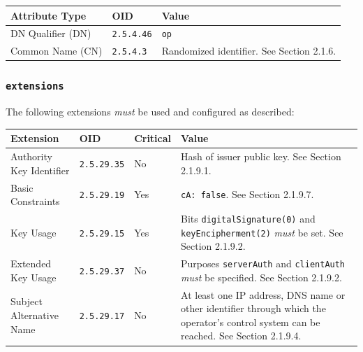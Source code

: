 \vspace*{0.5cm}
\noindent\begin{tabularx}{\textwidth}{| p{4cm} | p{2cm} | X |} \hline
\rowcolor{gray!33} Attribute Type & OID               & Value \\ \hline

DN Qualifier (DN)                 & \texttt{2.5.4.46} & \texttt{op} \\ \hline
Common Name (CN)                  & \texttt{2.5.4.3}  &  Randomized identifier. See Section 2.1.6. \\ \hline

\end{tabularx}
\vspace*{0.5cm}

\subsubsection{\texttt{extensions}}

The following extensions \textit{must} be used and configured as described:

\vspace*{0.5cm}
\noindent\begin{tabularx}{\textwidth}{| p{4cm} | p{2cm} | p{1.2cm} | X |} \hline
\rowcolor{gray!33} Extension & OID                & Critical & Value \\ \hline

Authority Key Identifier     & \texttt{2.5.29.35} & No       & Hash of issuer public key. See Section 2.1.9.1. \\ \hline
Basic Constraints            & \texttt{2.5.29.19} & Yes      & \texttt{cA: false}. See Section 2.1.9.7. \\ \hline
Key Usage                    & \texttt{2.5.29.15} & Yes      & Bits \texttt{digitalSignature(0)} and \texttt{keyEncipherment(2)} \textit{must} be set. See Section 2.1.9.2. \\ \hline
Extended Key Usage           & \texttt{2.5.29.37} & No       & Purposes \texttt{serverAuth} and \texttt{clientAuth} \textit{must} be specified. See Section 2.1.9.2. \\ \hline
Subject Alternative Name     & \texttt{2.5.29.17} & No       & At least one IP address, DNS name or other identifier through which the operator's control system can be reached. See Section 2.1.9.4. \\ \hline

\end{tabularx}
\vspace*{0.5cm}
